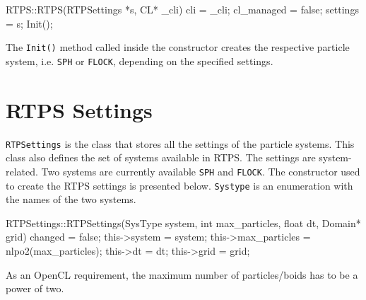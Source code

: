 
\begin{cppcode}{0}
RTPS::RTPS(RTPSettings *s, CL* _cli) 
{
	cli = _cli;
 	cl_managed = false;
	settings = s;
	Init();
}
\end{cppcode}

The \texttt{Init()} method called inside the constructor creates the respective particle system, i.e. \texttt{SPH} or \texttt{FLOCK}, depending on the specified settings.

\section{RTPS Settings}\label{rtpsettings}
\texttt{RTPSettings} is the class that stores all the settings of the particle systems. This class also defines the set of systems available in RTPS. The settings are system-related. Two systems are currently available \texttt{SPH} and \texttt{FLOCK}. The constructor used to create the RTPS settings is presented below. \texttt{Systype} is an enumeration with the names of the two systems. 


\begin{cppcode}{0}
RTPSettings::RTPSettings(SysType system, int max_particles, float dt, Domain* grid)
{
	changed = false;
	this->system = system;
	this->max_particles = nlpo2(max_particles);
	this->dt = dt;
	this->grid = grid;
}
\end{cppcode}

As an OpenCL requirement, the maximum number of particles/boids has to be a power of two. 

